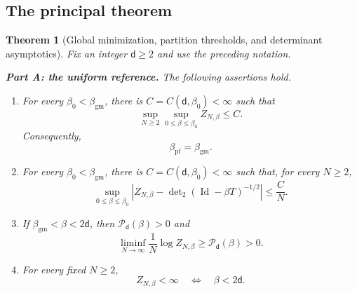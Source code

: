 \documentclass[11pt,reqno]{amsart}
\numberwithin{equation}{section}
\theoremstyle{plain}
\newtheorem{thm}{Theorem}[section]
\theoremstyle{definition}
\renewcommand{\d}{\mathsf d}
\newcommand{\Id}{\operatorname{Id}}
\newcommand{\be}{\beta}
\newcommand{\Pc}{\mathcal P}
\newcommand{\gm}{\mathrm{gm}}
\newcommand{\pf}{\mathrm{pf}}
\begin{document}
\subsection{The principal theorem}
\label{subsec:principal-theorem}

\begin{thm}[Global minimization, partition thresholds, and determinant asymptotics]
\label{thm:principal}
Fix an integer $\d\geq2$ and use the preceding notation.

\smallskip
\noindent\textup{\textbf{Part A: the uniform reference.}}
The following assertions hold.
\begin{enumerate}[label=\textup{(\roman*)}]
\item For every $\be_0<\beta_{\gm}$, there is $C=C(\d,\be_0)<\infty$ such that
\begin{equation}
 \sup_{N\geq2}\sup_{0\leq\be\leq\be_0}Z_{N,\be}\leq C.
 \label{eq:principal-order-one}
\end{equation}
Consequently,
\begin{equation}
 \beta_{\pf}=\beta_{\gm}.
 \label{eq:principal-threshold-identity}
\end{equation}

\item For every $\be_0<\beta_{\gm}$, there is $C=C(\d,\be_0)<\infty$ such that, for every $N\geq2$,
\begin{equation}
 \sup_{0\leq\be\leq\be_0}
 \left|Z_{N,\be}-\det\nolimits_2(\Id-\be T)^{-1/2}\right|
 \leq \frac C N.
 \label{eq:principal-homogeneous-rate}
\end{equation}

\item If $\beta_{\gm}<\be<2\d$, then $\Pc_{\d}(\be)>0$ and
\begin{equation}
 \liminf_{N\to\infty}\frac1N\log Z_{N,\be}
 \geq\Pc_{\d}(\be)>0.
 \label{eq:principal-positive-pressure}
\end{equation}

\item For every fixed $N\geq2$,
\begin{equation}
 Z_{N,\be}<\infty
 \quad\Longleftrightarrow\quad
 \be<2\d.
 \label{eq:principal-fixed-particle-integrability}
\end{equation}
\end{enumerate}


\end{thm}
\end{document}
